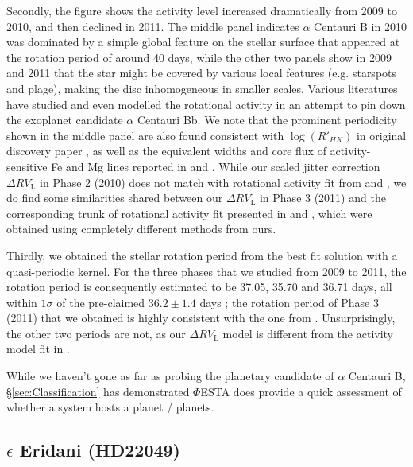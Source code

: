 Secondly, the figure shows the activity level increased dramatically from 2009 to 2010, and then declined in 2011. The middle panel indicates $\alpha$ Centauri B in 2010 was dominated by a simple global feature on the stellar surface that appeared at the rotation period of around 40 days, while the other two panels show in 2009 and 2011 that the star might be covered by various local features (e.g. starspots and plage), making the disc inhomogeneous in smaller scales. Various literatures have studied and even modelled the rotational activity in an attempt to pin down the exoplanet candidate $\alpha$ Centauri Bb. We note that the prominent periodicity shown in the middle panel are also found consistent with $\log (R'_{HK})$ in original discovery paper \cite{Dumusque_Centauri_B}, as well as the equivalent widths and core flux of activity-sensitive Fe and Mg lines reported in \cite{Thompson2017MNRAS} and \cite{Wise2018}. While our scaled jitter correction $\Delta RV_\text{L}$ in Phase 2 (2010) does not match with rotational activity fit from \cite{Dumusque_Centauri_B} and \cite{Hatzes2013}, we do find some similarities shared between our $\Delta RV_\text{L}$ in Phase 3 (2011) and the corresponding trunk of rotational activity fit presented in \cite{Dumusque_Centauri_B} and \cite{Hatzes2013}, which were obtained using completely different methods from ours. 

Thirdly, we obtained the stellar rotation period from the best fit solution with a quasi-periodic kernel. For the three phases that we studied from 2009 to 2011, the rotation period is consequently estimated to be 37.05, 35.70 and 36.71 days, all within $1\sigma$ of the pre-claimed $36.2\pm1.4$ days \cite{DeWarf2010}; the rotation period of Phase 3 (2011) that we obtained is highly consistent with the one from \cite{Dumusque_Centauri_B}. Unsurprisingly, the other two periods are not, as our $\Delta RV_\text{L}$ model is  different from the activity model fit in \cite{Dumusque_Centauri_B}. 

While we haven't gone as far as probing the planetary candidate of $\alpha$ Centauri B, \S\ref{sec:Classification} has demonstrated $\mathit{\Phi}$ESTA does provide a quick assessment of whether a system hosts a planet / planets. 





\subsection{$\epsilon$ Eridani (HD22049)}

